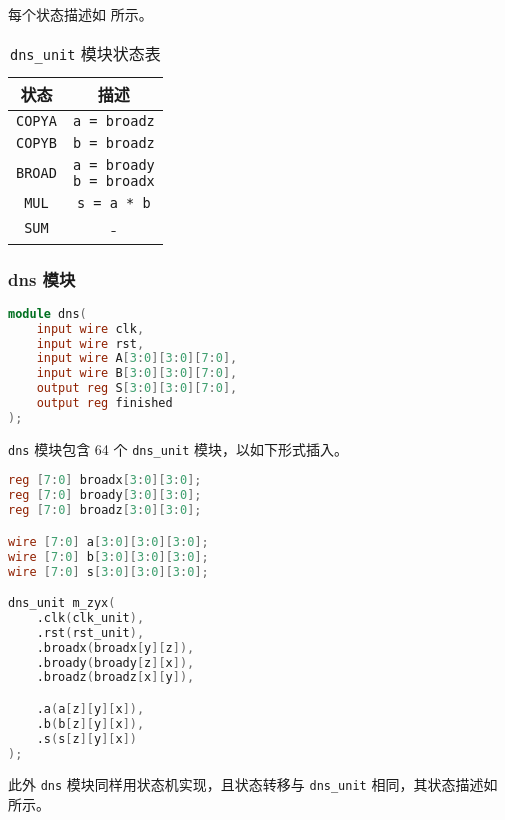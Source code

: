 \documentclass{zjureport-zh}
\begin{document}
\par 每个状态描述如 所示。

\begin{table}[h]
	\centering
	\caption{\texttt{dns\_unit} 模块状态表} \label{dns_unit_statetab}
	\vspace{1ex}
	\begin{tabular}{cc}
		\hline
		状态 & 描述 \\
		\hline
		\texttt{COPYA} & \texttt{a = broadz} \\
		\hline
		\texttt{COPYB} & \texttt{b = broadz} \\
		\hline
		\texttt{BROAD} & \makecell{\texttt{a = broady} \\ \texttt{b = broadx}} \\
		\hline
		\texttt{MUL} & \texttt{s = a * b} \\
		\hline
		\texttt{SUM} & - \\
		\hline
	\end{tabular}
\end{table}

\newpage
\subsubsection{dns 模块}
\begin{lstlisting}[language=verilog]
module dns(
	input wire clk,
	input wire rst,
	input wire A[3:0][3:0][7:0],
	input wire B[3:0][3:0][7:0],
	output reg S[3:0][3:0][7:0],
	output reg finished
);
\end{lstlisting}
\par \texttt{dns} 模块包含 64 个 \texttt{dns\_unit} 模块，以如下形式插入。
\begin{lstlisting}[language=verilog]
reg [7:0] broadx[3:0][3:0];
reg [7:0] broady[3:0][3:0];
reg [7:0] broadz[3:0][3:0];

wire [7:0] a[3:0][3:0][3:0];
wire [7:0] b[3:0][3:0][3:0];
wire [7:0] s[3:0][3:0][3:0];

dns_unit m_zyx(
	.clk(clk_unit),
	.rst(rst_unit),
	.broadx(broadx[y][z]),
	.broady(broady[z][x]),
	.broadz(broadz[x][y]),

	.a(a[z][y][x]),
	.b(b[z][y][x]),
	.s(s[z][y][x])
);
\end{lstlisting}

\par 此外 \texttt{dns} 模块同样用状态机实现，且状态转移与 \texttt{dns\_unit} 相同，其状态描述如 所示。
\end{document}
